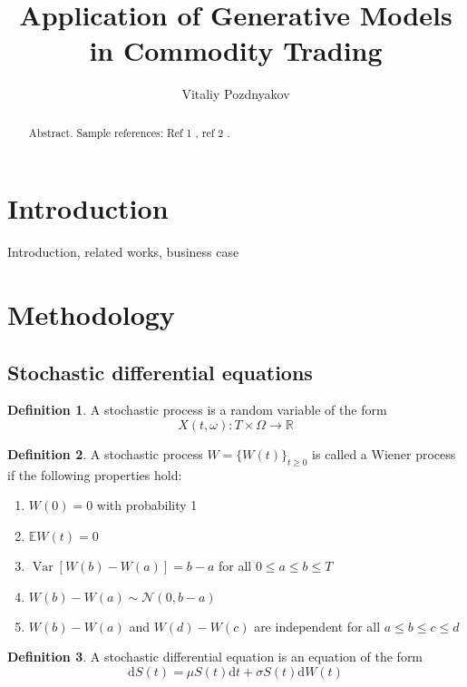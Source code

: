 \documentclass{article}
\title{Application of Generative Models \\ in Commodity Trading}
\author{Vitaliy Pozdnyakov}
\date{}
\theoremstyle{definition}
\newtheorem{definition}{Definition}[section]
\DeclareMathOperator{\Var}{Var}
\begin{document}
\maketitle

\begin{abstract}
    Abstract. Sample references: Ref 1 \cite{renscen}, ref 2 \citet{jebara}.
\end{abstract}

\section{Introduction}
Introduction, related works, business case

\section{Methodology}

\subsection{Stochastic differential equations}

\theoremstyle{definition}
\begin{definition}
    A stochastic process is a random variable of the form
    $$X(t, \omega): T \times \Omega \to \mathbb R$$
\end{definition}

\begin{definition}
    A stochastic process $W = \{W(t)\}_{t\geq0}$ is called a Wiener process if the following properties hold:
    \begin{enumerate}
        \item $W(0) = 0$ with probability 1
        \item $\mathbb E W(t) = 0$
        \item $\Var[W(b) - W(a)] = b-a$ for all $0\leq a \leq b \leq T$
        \item $W(b) - W(a) \sim \mathcal N (0, b-a)$
        \item $W(b) - W(a)$ and $W(d) - W(c)$ are independent for all $a \leq b \leq c \leq d$
    \end{enumerate}
\end{definition}

\begin{definition}
    A stochastic differential equation is an equation of the form
    \begin{equation}
        \mathrm d S(t) = \mu S(t) \mathrm dt + \sigma S(t) \mathrm d W(t)
    \end{equation}
\end{definition}
\end{document}
